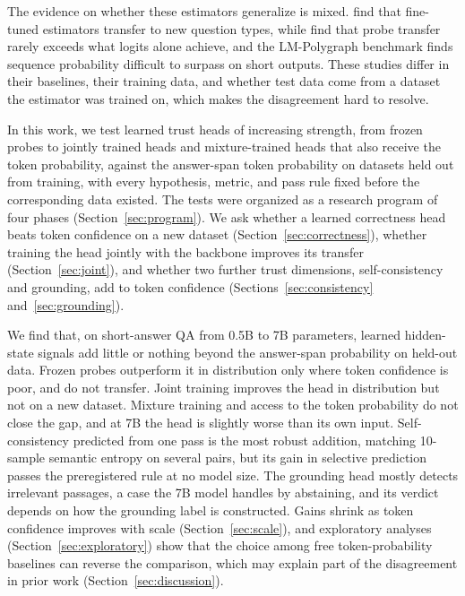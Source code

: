 \documentclass[10pt]{article}
\begin{document}
The evidence on whether these estimators generalize is mixed. \citet{kapoor2024large} find that fine-tuned estimators transfer to new question types, while \citet{orgad2025llms} find that probe transfer rarely exceeds what logits alone achieve, and the LM-Polygraph benchmark \citep{vashurin2025benchmarking} finds sequence probability difficult to surpass on short outputs. These studies differ in their baselines, their training data, and whether test data come from a dataset the estimator was trained on, which makes the disagreement hard to resolve.

In this work, we test learned trust heads of increasing strength, from frozen probes to jointly trained heads and mixture-trained heads that also receive the token probability, against the answer-span token probability on datasets held out from training, with every hypothesis, metric, and pass rule fixed before the corresponding data existed. The tests were organized as a research program of four phases (Section~\ref{sec:program}). We ask whether a learned correctness head beats token confidence on a new dataset (Section~\ref{sec:correctness}), whether training the head jointly with the backbone improves its transfer (Section~\ref{sec:joint}), and whether two further trust dimensions, self-consistency and grounding, add to token confidence (Sections~\ref{sec:consistency} and~\ref{sec:grounding}).

We find that, on short-answer QA from 0.5B to 7B parameters, learned hidden-state signals add little or nothing beyond the answer-span probability on held-out data. Frozen probes outperform it in distribution only where token confidence is poor, and do not transfer. Joint training improves the head in distribution but not on a new dataset. Mixture training and access to the token probability do not close the gap, and at 7B the head is slightly worse than its own input. Self-consistency predicted from one pass is the most robust addition, matching 10-sample semantic entropy on several pairs, but its gain in selective prediction passes the preregistered rule at no model size. The grounding head mostly detects irrelevant passages, a case the 7B model handles by abstaining, and its verdict depends on how the grounding label is constructed. Gains shrink as token confidence improves with scale (Section~\ref{sec:scale}), and exploratory analyses (Section~\ref{sec:exploratory}) show that the choice among free token-probability baselines can reverse the comparison, which may explain part of the disagreement in prior work (Section~\ref{sec:discussion}).
\end{document}
